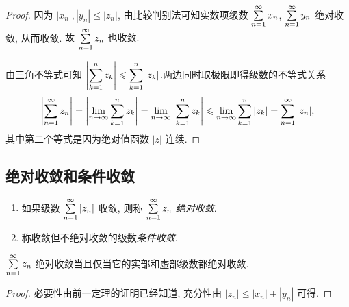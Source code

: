 \begin{proof}
	因为 $|x_n|,|y_n|\le|z_n|$, 由比较判别法可知实数项级数 $\sum\limits_{n=1}^\infty x_n$, $\sum\limits_{n=1}^\infty y_n$ 绝对收敛, 从而收敛.
	{故 $\sum\limits_{n=1}^\infty z_n$ 也收敛.}

	{由三角不等式可知
		$\displaystyle\left|\sum_{k=1}^n z_k\right|\leqslant \sum_{k=1}^n|z_k|$.两边同时取极限即得级数的不等式关系
		\[\left|\sum_{n=1}^\infty z_n\right|=\left|\lim_{n\to\infty}\sum_{k=1}^n z_k\right|=
		\lim_{n\to\infty}\left|\sum_{k=1}^n z_k\right|\leqslant\lim_{n\to\infty}\sum_{k=1}^n|z_k|=\sum_{n=1}^\infty |z_n|,\]其中第二个等式是因为绝对值函数 $|z|$ 连续.\qedhere}
\end{proof}

\subsection{绝对收敛和条件收敛}

\begin{definition}
		\begin{enumerate}
		\item 如果级数 $\sum\limits_{n=1}^\infty |z_n|$ 收敛, 则称 $\sum\limits_{n=1}^\infty z_n$ \emph{绝对收敛}.
		\item 称收敛但不绝对收敛的级数\emph{条件收敛}.
	\end{enumerate}
\end{definition}

\begin{theorem}
	$\sum\limits_{n=1}^\infty z_n$ 绝对收敛当且仅当它的实部和虚部级数都绝对收敛.
\end{theorem}

\begin{proof}
	必要性由前一定理的证明已经知道,
	{充分性由 $|z_n|\le|x_n|+|y_n|$ 可得.\qedhere}
\end{proof}


